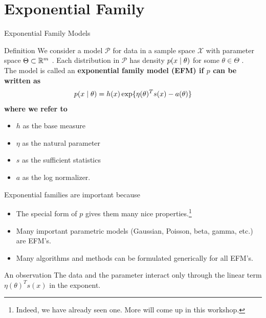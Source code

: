 \documentclass[10pt]{beamer}
\begin{document}
\section{Exponential Family}


\begin{frame}{Exponential Family Models}

\begin{sblock}{Definition}
We consider a model $\mathcal{P}$ for data in a sample space $\mathcal{X}$ with parameter space $\Theta \subset \mathbb{R}^m$ . Each distribution in $\mathcal{P}$ has density $p(x \; | \; \theta)$ for some $\theta \in \Theta$ . \\
\vfill
The model is called an \bf{exponential family model} (EFM) if $p$ can be written as
\begin{align*}
 p(x \; | \; \theta) = h(x) \exp \{ \eta(\theta)^T s(x) - a(\theta)\} 
 \end{align*}
where we refer to 
\begin{itemize}
\item $h$ as the base measure
\item  $\eta$ as the natural parameter
\item $s$ as the sufficient statistics
\item $a$ as the log normalizer. 
\end{itemize}
\end{sblock}
\end{frame}

\begin{frame}



\begin{sblock}{Exponential families are important because}
\begin{itemize}
\item The special form of $p$ gives them many nice properties.\footnote{Indeed, we have already seen one.  More will come up in this workshop.}
\item Many important parametric models (Gaussian, Poisson, beta, gamma, etc.) are EFM's.
\item Many algorithms and methods can be formulated generically for all EFM's. 
\end{itemize}
\end{sblock}
\vfill
\begin{sblock}{An observation}
The data and the parameter interact only through the linear term $\eta(\theta)^T s(x)$ in the exponent.
\end{sblock}

%
%
\end{frame}
\end{document}
